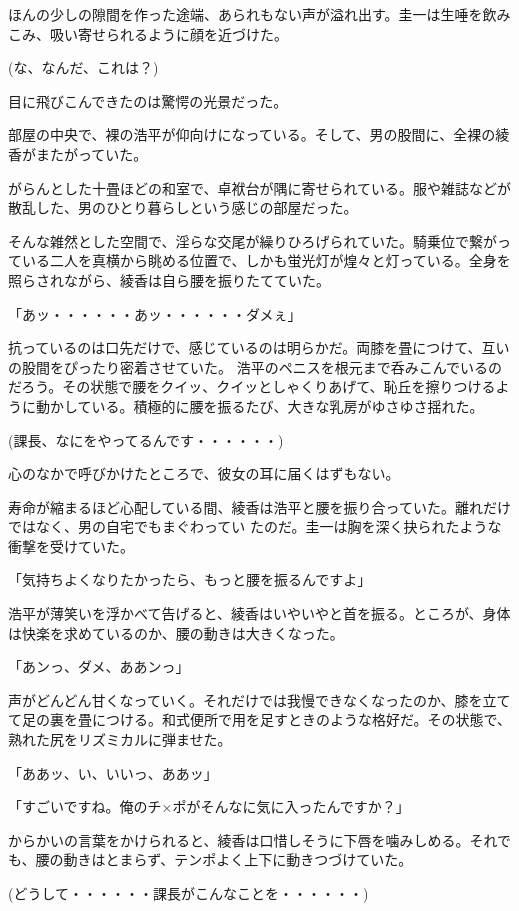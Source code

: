 ﻿\documentclass[book,tate]{jlreq}
\begin{document}
ほんの少しの隙間を作った途端、あられもない声が溢れ出す。圭一は生唾を飲みこみ、吸い寄せられるように顔を近づけた。

(な、なんだ、これは？)

目に飛びこんできたのは驚愕の光景だった。

部屋の中央で、裸の浩平が仰向けになっている。そして、男の股間に、全裸の綾香がまたがっていた。

がらんとした十畳ほどの和室で、卓袱台が隅に寄せられている。服や雑誌などが散乱した、男のひとり暮らしという感じの部屋だった。

そんな雑然とした空間で、淫らな交尾が繰りひろげられていた。騎乗位で繋がっている二人を真横から眺める位置で、しかも蛍光灯が煌々と灯っている。全身を照らされながら、綾香は自ら腰を振りたてていた。

「あッ・・・・・・あッ・・・・・・ダメぇ」

抗っているのは口先だけで、感じているのは明らかだ。両膝を畳につけて、互いの股間をぴったり密着させていた。 浩平のペニスを根元まで呑みこんでいるのだろう。その状態で腰をクイッ、クイッとしゃくりあげて、恥丘を擦りつけるように動かしている。積極的に腰を振るたび、大きな乳房がゆさゆさ揺れた。

(課長、なにをやってるんです・・・・・・)

心のなかで呼びかけたところで、彼女の耳に届くはずもない。

寿命が縮まるほど心配している間、綾香は浩平と腰を振り合っていた。離れだけではなく、男の自宅でもまぐわってい たのだ。圭一は胸を深く抉られたような衝撃を受けていた。

「気持ちよくなりたかったら、もっと腰を振るんですよ」

浩平が薄笑いを浮かべて告げると、綾香はいやいやと首を振る。ところが、身体は快楽を求めているのか、腰の動きは大きくなった。

「あンっ、ダメ、ああンっ」

声がどんどん甘くなっていく。それだけでは我慢できなくなったのか、膝を立てて足の裏を畳につける。和式便所で用を足すときのような格好だ。その状態で、熟れた尻をリズミカルに弾ませた。

「ああッ、い、いいっ、ああッ」

「すごいですね。俺のチ×ポがそんなに気に入ったんですか？」

からかいの言葉をかけられると、綾香は口惜しそうに下唇を噛みしめる。それでも、腰の動きはとまらず、テンポよく上下に動きつづけていた。

(どうして・・・・・・課長がこんなことを・・・・・・)
\end{document}
